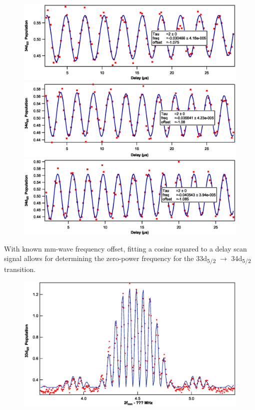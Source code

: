 \documentclass[landscape]{sciposter}
\begin{document}
\begin{multicols}{4}
\begin{figure}
\begin{center}
\includegraphics[scale = 1]{data68.eps}
\includegraphics[scale = 1]{data67.eps}
\includegraphics[scale = 1]{data69.eps}
\end{center}
\end{figure}

With known mm-wave frequency offset, fitting a cosine squared to a delay scan signal allows for determining the zero-power frequency for the 33d\textsubscript{5/2} $\rightarrow$ 34d\textsubscript{5/2} transition.

\begin{figure}
	\begin{center}
		\includegraphics[scale = 1]{fringes.eps}
	\end{center}
\end{figure}



\end{multicols}
\end{document}
